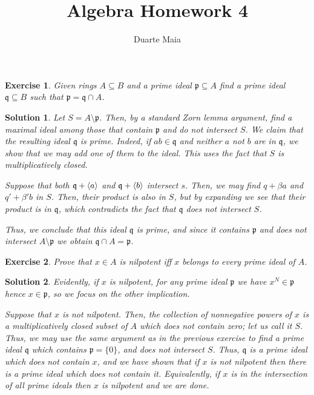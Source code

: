 \documentclass{article}
\title{Algebra Homework 4}
\author{Duarte Maia}
\newtheorem{ex}{Exercise}
\theoremstyle{nonumberplain}
\newtheorem{sol}{Solution}
\newcommand{\gp}{\mathfrak{p}}
\newcommand{\gq}{\mathfrak{q}}
\DeclarePairedDelimiter{\braket}{\langle}{\rangle}
\begin{document}
\maketitle

\begin{ex}
Given rings $A \subseteq B$ and a prime ideal $\gp \subseteq A$ find a prime ideal $\gq \subseteq B$ such that $\gp = \gq \cap A$.
\end{ex}

\begin{sol}
Let $S = A \setminus \gp$. Then, by a standard Zorn lemma argument, find a maximal ideal among those that contain $\gp$ and do not intersect $S$. We claim that the resulting ideal $\gq$ is prime. Indeed, if $ab \in \gq$ and neither $a$ not $b$ are in $\gq$, we show that we may add one of them to the ideal. This uses the fact that $S$ is multiplicatively closed.

Suppose that both $\gq + \braket{a}$ and $\gq + \braket{b}$ intersect $s$. Then, we may find $q + \beta a$ and $q' + \beta' b$ in $S$. Then, their product is also in $S$, but by expanding we see that their product is in $\gq$, which contradicts the fact that $\gq$ does not intersect $S$.

Thus, we conclude that this ideal $\gq$ is prime, and since it contains $\gp$ and does not intersect $A \setminus \gp$ we obtain $\gq \cap A = \gp$.
\end{sol}

\begin{ex}
Prove that $x \in A$ is nilpotent iff $x$ belongs to every prime ideal of $A$.
\end{ex}

\begin{sol}
Evidently, if $x$ is nilpotent, for any prime ideal $\gp$ we have $x^N \in \gp$ hence $x \in \gp$, so we focus on the other implication.

Suppose that $x$ is not nilpotent. Then, the collection of nonnegative powers of $x$ is a multiplicatively closed subset of $A$ which does not contain zero; let us call it $S$. Thus, we may use the same argument as in the previous exercise to find a prime ideal $\gq$ which contains $\gp = \{0\}$, and does not intersect $S$. Thus, $\gq$ is a prime ideal which does not contain $x$, and we have shown that if $x$ is not nilpotent then there is a prime ideal which does not contain it. Equivalently, if $x$ is in the intersection of all prime ideals then $x$ is nilpotent and we are done.
\end{sol}
\end{document}
